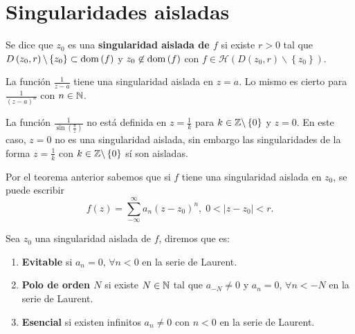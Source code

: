\section{Singularidades aisladas}
\begin{definition}
	Se dice que $\displaystyle z_{0} $ es una \textbf{singularidad aislada de $\displaystyle f $} si existe $\displaystyle r > 0 $ tal que $\displaystyle D\left(z_{0}, r\right)\backslash \left\{ z_{0}\right\} \subset \operatorname{dom}\left(f\right) $ y $\displaystyle z_{0}\not\in\operatorname{dom}\left(f\right) $ con $\displaystyle f \in \mathcal{H}\left(D\left(z_{0}, r\right)\backslash \left\{ z_{0}\right\} \right) $. 
\end{definition}
\begin{eg}
La función $\displaystyle \frac{1}{z-a} $ tiene una singularidad aislada en $\displaystyle z = a $. Lo mismo es cierto para $\displaystyle \frac{1}{\left(z-a\right)^{n}} $ con $\displaystyle n \in \mathbb{N} $. 
\end{eg}
\begin{eg}
	La función $\displaystyle \frac{1}{\sin\left(\frac{\pi }{z}\right)}$ no está definida en $\displaystyle z = \frac{1}{k} $ para $\displaystyle k \in \mathbb{Z}\backslash \left\{ 0\right\}  $ y $\displaystyle z = 0 $. En este caso, $\displaystyle z = 0 $ no es una singularidad aislada, sin embargo las singularidades de la forma $\displaystyle z = \frac{1}{k} $ con $\displaystyle k \in \mathbb{Z}\backslash \left\{ 0\right\}  $ sí son aisladas.
\end{eg}
Por el teorema anterior sabemos que si $\displaystyle f $ tiene una singularidad aislada en $\displaystyle z_{0} $, se puede escribir
\[f\left(z\right)=\sum^{\infty}_{-\infty}a_{n}\left(z-z_{0}\right)^{n}, \; 0 < \left|z-z_{0}\right|<r .\]
\begin{definition} Sea $\displaystyle z_{0} $ una singularidad aislada de $\displaystyle f $, diremos que es:
\begin{enumerate}
\item \textbf{Evitable} si $\displaystyle a_{n}=0 $, $\displaystyle \forall n < 0 $ en la serie de Laurent. 
\item \textbf{Polo de orden $\displaystyle N $} si existe $\displaystyle N \in \mathbb{N} $ tal que $\displaystyle a_{-N}\neq 0 $ y $\displaystyle a_{n}=0 $, $\displaystyle \forall n <-N $ en la serie de Laurent.  
\item \textbf{Esencial} si existen infinitos $\displaystyle a_{n}\neq 0 $ con $\displaystyle n < 0 $ en la serie de Laurent. 
\end{enumerate}
\end{definition}
